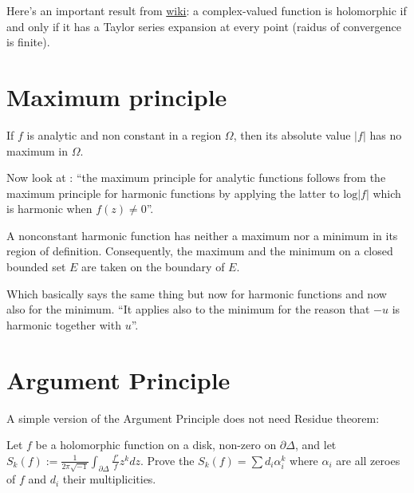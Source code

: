 \medskip\noindent
Here's an important result from
\href{https://en.wikipedia.org/wiki/Analyticity_of_holomorphic_functions}{wiki}:
a complex-valued function is holomorphic if and only if it
has a Taylor series expansion at every point (raidus of convergence is finite).


\section{Maximum principle}
\label{section-maximum-principle}

\begin{theorem}
\label{theorem-maximum-principle}
\begin{reference}
\cite[Theorem 12, p.134]{ahl}
\end{reference}
If $f$ is analytic and non constant in a region $\Omega$,
then its absolute value $|f|$ has no maximum in $\Omega$.
\end{theorem}

Now look at \cite[p. 166]{ahl}:
``the maximum principle for analytic functions
follows from the maximum principle for harmonic functions
by applying the latter to $\text{log}|f|$ which is harmonic
when $f(z)\neq 0$''.

\begin{theorem}
\label{theorem-maximum-principle-harmonic}
A nonconstant harmonic function has
neither a maximum nor a minimum in its region of definition.
Consequently, the maximum and the minimum
on a closed bounded set $E$ are taken on the boundary of $E$.
\end{theorem}

\noindent
Which basically says the same thing but now for harmonic functions
and now also for the minimum.
``It applies also to the minimum
for the reason that $-u$ is harmonic together with $u$''.


\section{Argument Principle}
\label{section-argument-principle}

\noindent
A simple version of the Argument Principle does not need Residue theorem:

\begin{exercise}
\label{exercise-argument-principle}
Let $f$ be a holomorphic function on a disk, non-zero on $\partial \Delta$, and
let $S_k(f):=\frac{1}{2\pi\sqrt{-1}}\int_{\partial\Delta}\frac{f'}{f}z^kdz$.
Prove the $S_k(f)=\sum d_i\alpha_i^k$ where $\alpha_i$ are all zeroes of $f$ and
$d_i$ their multiplicities.
\end{exercise}

